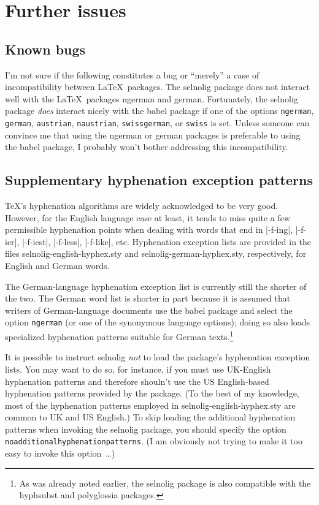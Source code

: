 \documentclass[11pt]{article}
\newcommand{\pkg}[1]{\textsf{#1}}
\newcommand{\opt}[1]{\texttt{#1}}
\begin{document}
\section{Further issues} \label{sec:further}

\subsection{Known bugs}

I'm not sure if the following constitutes a bug or \enquote{merely} a case of incompatibility between  \LaTeX\ packages. The \pkg{selnolig} package does not interact well with the \LaTeX\ packages \pkg{ngerman} and \pkg{german}. Fortunately, the \pkg{selnolig} package \emph{does} interact nicely with the \pkg{babel} package if one of the options \opt{ngerman}, \opt{german}, \opt{austrian}, \opt{naustrian}, \opt{swissgerman}, or \opt{swiss} is set. Unless someone can convince me that using the \pkg{ngerman} or \pkg{german} packages is preferable to using the \pkg{babel} package, I probably won't bother addressing this incompatibility.



\subsection{Supplementary hyphenation exception patterns} \label{sec:addlhyph}

\TeX's hyphenation algorithms are widely acknowledged to be very good. However, for the English language case at least, it tends to miss quite a few permissible hyphenation points when dealing with words that end in |-f-ing|, |-f-ier|, |-f-iest|, |-f-less|, |-f-like|, etc. Hyphenation exception lists are provided in the files \pkg{selnolig-english-hyphex.sty} and \pkg{selnolig-german-hyphex.sty}, respectively, for English and German words.

The German-language hyphenation exception list is currently still the shorter of the two. The German word list is shorter in part because it is assumed that writers of German-language documents use the \pkg{babel} package and select the option \opt{ngerman} (or one of the synonymous language options); doing so also loads specialized hyphenation patterns suitable for German texts.\footnote{As was already noted earlier, the \pkg{selnolig} package is also compatible with the \pkg{hyphsubst} and \pkg{polyglossia} packages.} 

It is possible to instruct \pkg{selnolig} \emph{not} to load the package's hyphenation exception lists. You may want to do so, for instance, if you must use UK-English hyphenation patterns and therefore shouln't use the US English-based hyphenation patterns provided by the package. (To the best of my knowledge, most of the hyphenation patterns employed in \pkg{selnolig-english-hyphex.sty} are common to UK and US English.) To skip loading the additional hyphenation patterns when invoking the \pkg{selnolig} package, you should specify the option \opt{noadditional\-hyphen\-a\-tion\-patterns}. (I am obviously not trying to make it too easy to invoke this option~\dots)
\end{document}
